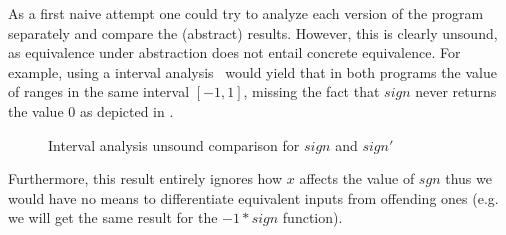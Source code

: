 As a first naive attempt one could try to analyze each version of the program separately and compare the (abstract) results. However, this is clearly unsound, as equivalence under abstraction does not entail concrete equivalence. For example, using a interval analysis~\cite{TODO} would yield that in both programs the value of  ranges in the same interval $[-1,1]$, missing the fact that $sign$ never returns the value $0$ as depicted in .
\begin{figure}
\caption{Interval analysis unsound comparison for $sign$ and $sign'$}
\end{figure}
Furthermore, this result entirely ignores how $x$ affects the value of $sgn$ thus we would have no means to differentiate equivalent inputs from offending ones (e.g. we will get the same result for the $-1 * sign$ function).

